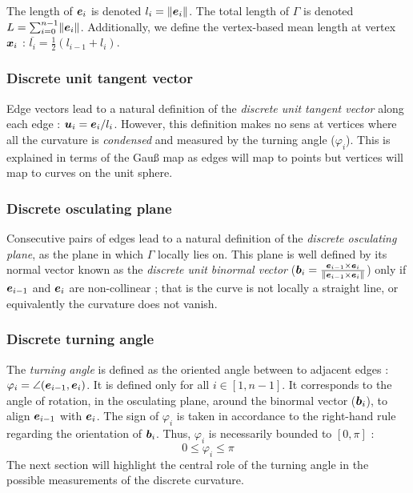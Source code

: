 The length of $\boldsymbol{e}_i$ is denoted $l_i = \lVert\boldsymbol{e}_i\rVert$. The total length of $\Gamma$ is denoted $L = \sum_{i=0}^{n-1} \lVert\boldsymbol{e}_i\rVert$. Additionally, we define the vertex-based mean length at vertex $\boldsymbol{x}_i$ : $\overbar{l_i} = \tfrac{1}{2}(l_{i-1} + l_i)$.

\subsubsection{Discrete unit tangent vector}\label{sec:tangent_edge}
Edge vectors lead to a natural definition of the \emph{discrete unit tangent vector} along each edge : $\boldsymbol{u}_i = \boldsymbol{e}_i / l_i$. However, this definition makes no sens at vertices where all the curvature is \emph{condensed} and measured by the turning angle ($\varphi_i$). This is explained in terms of the Gau{\ss} map as edges will map to points but vertices will map to curves on the unit sphere.

\subsubsection{Discrete osculating plane}
Consecutive pairs of edges lead to a natural definition of the \emph{discrete osculating plane}, as the plane in which $\Gamma$ locally lies on. This plane is well defined by its normal vector known as the \emph{discrete unit binormal vector} ($\boldsymbol{b}_i = \frac{\boldsymbol{e}_{i-1} \times \boldsymbol{e}_{i}}{\lVert\boldsymbol{e}_{i-1} \times \boldsymbol{e}_{i}\rVert}$) only if $\boldsymbol{e}_{i-1}$ and $\boldsymbol{e}_{i}$ are non-collinear ; that is the curve is not locally a straight line, or equivalently the curvature does not vanish.

\subsubsection{Discrete turning angle}
The \emph{turning angle} is defined as the oriented angle between to adjacent edges : $\varphi_i=\angle(\boldsymbol{e}_{i-1},\boldsymbol{e}_i)$. It is defined only for all $i \in [1,n-1]$. It corresponds to the angle of rotation, in the osculating plane, around the binormal vector ($\boldsymbol{b}_i$), to align $\boldsymbol{e}_{i-1}$ with $\boldsymbol{e}_{i}$. The sign of $\varphi_i$ is taken in accordance to the right-hand rule regarding the orientation of $\boldsymbol{b}_i$. Thus, $\varphi_i$ is necessarily bounded to $[0,\pi]$ :
\begin{equation}
	0 \leqslant \varphi_i \leqslant \pi
\end{equation}
The next section will highlight the central role of the turning angle in the possible measurements of the discrete curvature.

